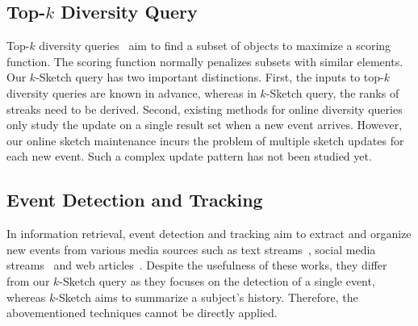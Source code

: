 \subsection{Top-$k$ Diversity Query}
Top-$k$ diversity queries~\cite{agrawal2009diversifying,borodin2012max,drosou2014diverse,chen2015diversity}
aim to find a subset of objects to maximize a scoring function. The scoring function normally penalizes
subsets with similar elements. Our 
$k$-Sketch query has two important distinctions.
First, the inputs to top-$k$ diversity queries are known in advance, whereas in $k$-Sketch query, the ranks of streaks need to be derived. 
Second, existing methods for online diversity queries~\cite{borodin2012max,drosou2014diverse,chen2015diversity} only study
the update on a single result set when a new event arrives. However, our online sketch maintenance 
incurs the problem of multiple sketch updates for each new event. Such a complex update pattern has not been studied yet.

\subsection{Event Detection and Tracking}
In information retrieval, event detection and tracking aim to extract and organize new events from various
media sources such as text streams~\cite{allan1998line,brants2003asystem}, social media streams~\cite{li2015social} and web articles~\cite{Vuurens2015Onlinenews}. 
Despite the usefulness of these works, they differ from our $k$-Sketch query as they focuses on the detection of a single event, whereas $k$-Sketch aims to summarize a subject's history.
Therefore, the abovementioned techniques cannot be directly applied.

